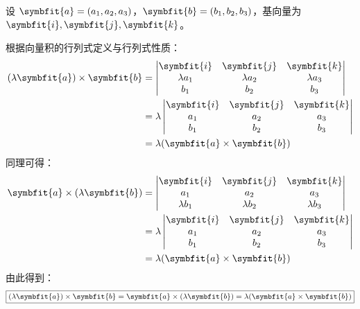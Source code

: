 \begin{myproof}
    设 $\symbfit{a} = (a_1, a_2, a_3)$，$\symbfit{b} = (b_1, b_2, b_3)$，基向量为 $\symbfit{i}, \symbfit{j}, \symbfit{k}$。


    根据向量积的行列式定义与行列式性质：
    \begin{equation*}
        \begin{aligned}
            (\lambda\symbfit{a}) \times \symbfit{b} & = \begin{vmatrix} \symbfit{i} & \symbfit{j} & \symbfit{k} \\ \lambda a_1 & \lambda a_2 & \lambda a_3 \\ b_1 & b_2 & b_3 \end{vmatrix} \\
                                                    & = \lambda \begin{vmatrix} \symbfit{i} & \symbfit{j} & \symbfit{k} \\ a_1 & a_2 & a_3 \\ b_1 & b_2 & b_3 \end{vmatrix}                 \\
                                                    & = \lambda(\symbfit{a} \times \symbfit{b})
        \end{aligned}
    \end{equation*}
    同理可得：
    \begin{equation*}
        \begin{aligned}
            \symbfit{a} \times (\lambda\symbfit{b}) & = \begin{vmatrix} \symbfit{i} & \symbfit{j} & \symbfit{k} \\ a_1 & a_2 & a_3 \\ \lambda b_1 & \lambda b_2 & \lambda b_3 \end{vmatrix} \\
                                                    & = \lambda \begin{vmatrix} \symbfit{i} & \symbfit{j} & \symbfit{k} \\ a_1 & a_2 & a_3 \\ b_1 & b_2 & b_3 \end{vmatrix}                 \\
                                                    & = \lambda(\symbfit{a} \times \symbfit{b})
        \end{aligned}
    \end{equation*}
    由此得到：
    \begin{equation*}
        \boxed{(\lambda\symbfit{a}) \times \symbfit{b} = \symbfit{a} \times (\lambda\symbfit{b}) = \lambda(\symbfit{a} \times \symbfit{b})}
    \end{equation*}


\end{myproof}
